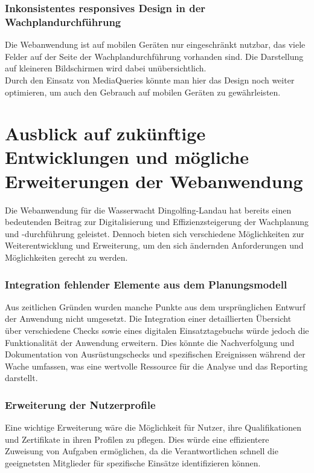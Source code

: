 \documentclass[fontsize=12pt,openright,oneside,paper=a4,BCOR=1cm]{scrbook}
\begin{document}
\subsubsection{Inkonsistentes responsives Design in der Wachplandurchführung}
Die Webanwendung ist auf mobilen Geräten nur eingeschränkt nutzbar, das viele Felder auf der Seite der Wachplandurchführung vorhanden sind. Die Darstellung auf kleineren Bildschirmen wird dabei unübersichtlich. \\
Durch den Einsatz von MediaQueries könnte man hier das Design noch weiter optimieren, um auch den Gebrauch auf mobilen Geräten zu gewährleisten. 


\section{Ausblick auf zukünftige Entwicklungen und mögliche Erweiterungen der Webanwendung}
Die Webanwendung für die Wasserwacht Dingolfing-Landau hat bereits einen bedeutenden Beitrag zur Digitalisierung und Effizienzsteigerung der Wachplanung und -durchführung geleistet. Dennoch bieten sich verschiedene Möglichkeiten zur Weiterentwicklung und Erweiterung, um den sich ändernden Anforderungen und Möglichkeiten gerecht zu werden.

\subsubsection{Integration fehlender Elemente aus dem Planungsmodell}
Aus zeitlichen Gründen wurden manche Punkte aus dem ursprünglichen Entwurf der Anwendung nicht umgesetzt. Die Integration einer detaillierten Übersicht über verschiedene Checks sowie eines digitalen Einsatztagebuchs würde jedoch die Funktionalität der Anwendung erweitern. Dies könnte die Nachverfolgung und Dokumentation von Ausrüstungschecks und spezifischen Ereignissen während der Wache umfassen, was eine wertvolle Ressource für die Analyse und das Reporting darstellt.

\subsubsection{Erweiterung der Nutzerprofile}
Eine wichtige Erweiterung wäre die Möglichkeit für Nutzer, ihre Qualifikationen und Zertifikate in ihren Profilen zu pflegen. Dies würde eine effizientere Zuweisung von Aufgaben ermöglichen, da die Verantwortlichen schnell die geeignetsten Mitglieder für spezifische Einsätze identifizieren können.
\end{document}
